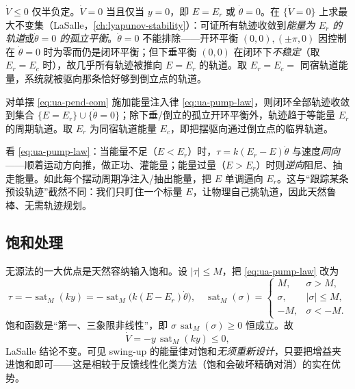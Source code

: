 \begin{derivation}
$\dot{V}\le0$ 仅半负定。$\dot{V}=0$ 当且仅当 $y=0$，即 $E=E_r$ 或 $\dot{\theta}=0$。在 $\{\dot{V}=0\}$ 上求最大不变集（LaSalle，\cref{ch:lyapunov-stability}）：可证所有轨迹收敛到\emph{能量为 $E_r$ 的轨道}或\emph{$\dot{\theta}=0$ 的孤立平衡}。$\dot{\theta}=0$ 不能排除——开环平衡 $(0,0),(\pm\pi,0)$ 因控制在 $\dot{\theta}=0$ 时为零而仍是闭环平衡；但下垂平衡 $(0,0)$ 在闭环下\emph{不稳定}（取 $E_r=E_c$ 时），故几乎所有轨迹被推向 $E=E_r$ 的轨道。取 $E_r=E_c=$ 同宿轨道能量，系统就被驱向那条恰好够到倒立点的轨道。
\end{derivation}

\begin{theorem}\label{thm:ua-energy-conv}
对单摆 \cref{eq:ua-pend-eom} 施加能量注入律 \cref{eq:ua-pump-law}，则闭环全部轨迹收敛到集合 $\{E=E_r\}\cup\{\dot{\theta}=0\}$；除下垂/倒立的孤立开环平衡外，轨迹趋于等能量 $E_r$ 的周期轨道。取 $E_r$ 为同宿轨道能量 $E_c$，即把摆驱向通过倒立点的临界轨道。
\end{theorem}

\begin{insight}
看 \cref{eq:ua-pump-law}：当能量不足（$E<E_r$）时，$\tau=k(E_r-E)\dot{\theta}$ 与速度\emph{同向}——顺着运动方向推，做正功、灌能量；能量过量（$E>E_r$）时则\emph{逆向}阻尼、抽走能量。如此每个摆动周期净注入/抽出能量，把 $E$ 单调逼向 $E_r$。这与“跟踪某条预设轨迹”截然不同：我们只盯住一个标量 $E$，让物理自己挑轨道，因此天然鲁棒、无需轨迹规划。
\end{insight}

\subsection{饱和处理}\label{sec:ua-saturation}

无源法的一大优点是天然容纳输入饱和。设 $|\tau|\le M$，把 \cref{eq:ua-pump-law} 改为
\begin{equation}\label{eq:ua-sat-law}
  \tau=-\operatorname{sat}_M(k y)=-\operatorname{sat}_M\!\big(k(E-E_r)\dot{\theta}\big),\quad
  \operatorname{sat}_M(\sigma)=\begin{cases}M,&\sigma>M,\\\sigma,&|\sigma|\le M,\\-M,&\sigma<-M.\end{cases}
\end{equation}
饱和函数是“第一、三象限非线性”，即 $\sigma\,\operatorname{sat}_M(\sigma)\ge0$ 恒成立。故
\begin{equation}\label{eq:ua-Vdot-sat}
  \dot{V}=-y\,\operatorname{sat}_M(ky)\le0,
\end{equation}
LaSalle 结论不变。可见 swing-up 的能量律对饱和\emph{无须重新设计}，只要把增益夹进饱和即可——这是相较于反馈线性化类方法（饱和会破坏精确对消）的实在优势。

